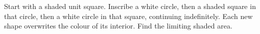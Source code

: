 Start with a shaded unit square. Inscribe a white circle, then a shaded square in that circle, then a white circle in that square, continuing indefinitely. Each new shape overwrites the colour of its interior. Find the limiting shaded area.
